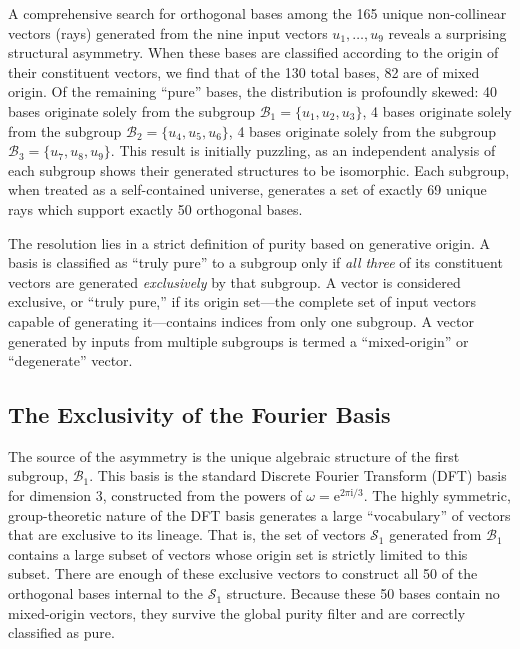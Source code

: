 \documentclass[%
  reprint,
  superscriptaddress,
  showpacs,
  showkeys,
  amsmath,amssymb,
  pra,
  longbibliography,
  floatfix,
  x11names
]{revtex4-2}
\newcommand{\ii}{\mathrm{i}}
\begin{document}
A comprehensive search for orthogonal bases among the 165 unique non-collinear vectors (rays) generated from the nine input vectors
$u_1, \dots, u_9$ reveals a surprising structural asymmetry. When these bases are classified according to the origin of their constituent vectors,
we find that of the 130 total bases, 82 are of mixed origin. Of the remaining ``pure'' bases, the distribution is profoundly skewed:
40 bases originate solely from the subgroup $\mathcal{B}_1 = \{u_1, u_2, u_3\}$,
4 bases originate solely from the subgroup $\mathcal{B}_2 = \{u_4, u_5, u_6\}$,
4 bases originate solely from the subgroup $\mathcal{B}_3 = \{u_7, u_8, u_9\}$.
This result is initially puzzling, as an independent analysis of each subgroup shows their generated structures to be isomorphic. Each subgroup, when treated as a self-contained universe, generates a set of exactly 69 unique rays which support exactly 50 orthogonal bases.

The resolution lies in a strict definition of purity based on generative origin. A basis is classified as ``truly pure'' to a subgroup only if \emph{all three} of its constituent vectors are generated \emph{exclusively} by that subgroup. A vector is considered exclusive, or ``truly pure,'' if its origin set---the complete set of input vectors capable of generating it---contains indices from only one subgroup. A vector generated by inputs from multiple subgroups is termed a ``mixed-origin'' or ``degenerate'' vector.

\subsection{The Exclusivity of the Fourier Basis}

The source of the asymmetry is the unique algebraic structure of the first subgroup, $\mathcal{B}_1$. This basis is the standard Discrete Fourier Transform (DFT) basis for dimension 3, constructed from the powers of $\omega = \mathrm{e}^{2\pi \ii{}/3}$.
The highly symmetric, group-theoretic nature of the DFT basis generates a large ``vocabulary'' of vectors that are exclusive to its lineage.
That is, the set of vectors $\mathcal{S}_1$ generated from $\mathcal{B}_1$
contains a large subset of vectors whose origin set is strictly limited to this subset.
There are enough of these exclusive vectors to construct all 50 of the orthogonal bases internal to the $\mathcal{S}_1$ structure.
Because these 50 bases contain no mixed-origin vectors, they survive the global purity filter and are correctly classified as pure.
\end{document}
